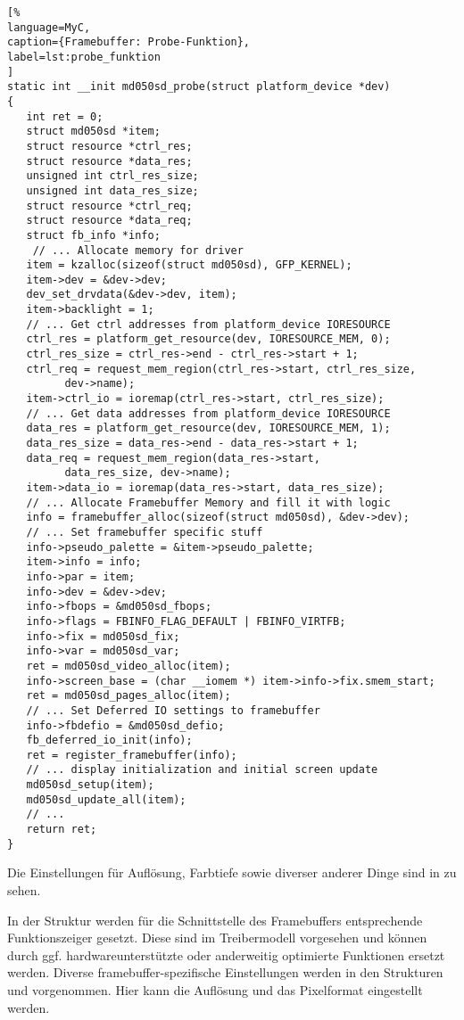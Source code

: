\begin{lstlisting}[%
language=MyC,
caption={Framebuffer: Probe-Funktion},
label=lst:probe_funktion
]
static int __init md050sd_probe(struct platform_device *dev)
{
   int ret = 0;
   struct md050sd *item;
   struct resource *ctrl_res;
   struct resource *data_res;
   unsigned int ctrl_res_size;
   unsigned int data_res_size;
   struct resource *ctrl_req;
   struct resource *data_req;
   struct fb_info *info;
	// ... Allocate memory for driver
   item = kzalloc(sizeof(struct md050sd), GFP_KERNEL);
   item->dev = &dev->dev;
   dev_set_drvdata(&dev->dev, item);
   item->backlight = 1;
   // ... Get ctrl addresses from platform_device IORESOURCE
   ctrl_res = platform_get_resource(dev, IORESOURCE_MEM, 0);
   ctrl_res_size = ctrl_res->end - ctrl_res->start + 1;
   ctrl_req = request_mem_region(ctrl_res->start, ctrl_res_size,
         dev->name);
   item->ctrl_io = ioremap(ctrl_res->start, ctrl_res_size);
   // ... Get data addresses from platform_device IORESOURCE
   data_res = platform_get_resource(dev, IORESOURCE_MEM, 1);
   data_res_size = data_res->end - data_res->start + 1;
   data_req = request_mem_region(data_res->start,
         data_res_size, dev->name);
   item->data_io = ioremap(data_res->start, data_res_size);
   // ... Allocate Framebuffer Memory and fill it with logic
   info = framebuffer_alloc(sizeof(struct md050sd), &dev->dev);
   // ... Set framebuffer specific stuff
   info->pseudo_palette = &item->pseudo_palette;
   item->info = info;
   info->par = item;
   info->dev = &dev->dev;
   info->fbops = &md050sd_fbops;
   info->flags = FBINFO_FLAG_DEFAULT | FBINFO_VIRTFB;
   info->fix = md050sd_fix;
   info->var = md050sd_var;
   ret = md050sd_video_alloc(item);
   info->screen_base = (char __iomem *) item->info->fix.smem_start;
   ret = md050sd_pages_alloc(item);
   // ... Set Deferred IO settings to framebuffer
   info->fbdefio = &md050sd_defio;
   fb_deferred_io_init(info);
   ret = register_framebuffer(info);
   // ... display initialization and initial screen update
   md050sd_setup(item);
   md050sd_update_all(item);
   // ...
   return ret;
}
\end{lstlisting}
Die Einstellungen für Auflösung, Farbtiefe sowie diverser anderer Dinge sind in  zu sehen. 

In der Struktur  werden für die Schnittstelle des Framebuffers entsprechende Funktionszeiger gesetzt. Diese sind im Treibermodell vorgesehen und können durch ggf. hardwareunterstützte oder anderweitig optimierte Funktionen ersetzt werden. Diverse framebuffer-spezifische Einstellungen werden in den Strukturen  und  vorgenommen. Hier kann die Auflösung und das Pixelformat eingestellt werden. 

